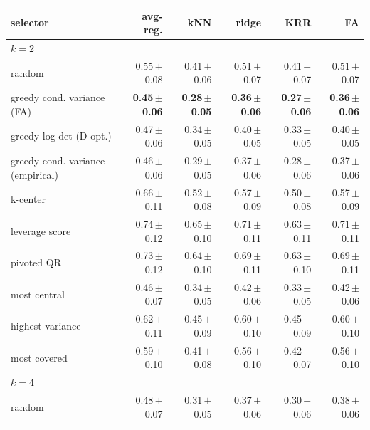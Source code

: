 \begin{tabular}{lrrrrr}
\toprule
selector & avg-reg. & kNN & ridge & KRR & FA \\
\midrule
\multicolumn{6}{l}{\emph{$k=2$}} \\
random & 0.55\,{\scriptsize$\pm$0.08} & 0.41\,{\scriptsize$\pm$0.06} & 0.51\,{\scriptsize$\pm$0.07} & 0.41\,{\scriptsize$\pm$0.07} & 0.51\,{\scriptsize$\pm$0.07} \\
greedy cond. variance (FA) & \textbf{0.45\,{\scriptsize$\pm$0.06}} & \textbf{0.28\,{\scriptsize$\pm$0.05}} & \textbf{0.36\,{\scriptsize$\pm$0.06}} & \textbf{0.27\,{\scriptsize$\pm$0.06}} & \textbf{0.36\,{\scriptsize$\pm$0.06}} \\
greedy log-det (D-opt.) & 0.47\,{\scriptsize$\pm$0.06} & 0.34\,{\scriptsize$\pm$0.05} & 0.40\,{\scriptsize$\pm$0.05} & 0.33\,{\scriptsize$\pm$0.05} & 0.40\,{\scriptsize$\pm$0.05} \\
greedy cond. variance (empirical) & 0.46\,{\scriptsize$\pm$0.06} & 0.29\,{\scriptsize$\pm$0.05} & 0.37\,{\scriptsize$\pm$0.06} & 0.28\,{\scriptsize$\pm$0.06} & 0.37\,{\scriptsize$\pm$0.06} \\
k-center & 0.66\,{\scriptsize$\pm$0.11} & 0.52\,{\scriptsize$\pm$0.08} & 0.57\,{\scriptsize$\pm$0.09} & 0.50\,{\scriptsize$\pm$0.08} & 0.57\,{\scriptsize$\pm$0.09} \\
leverage score & 0.74\,{\scriptsize$\pm$0.12} & 0.65\,{\scriptsize$\pm$0.10} & 0.71\,{\scriptsize$\pm$0.11} & 0.63\,{\scriptsize$\pm$0.11} & 0.71\,{\scriptsize$\pm$0.11} \\
pivoted QR & 0.73\,{\scriptsize$\pm$0.12} & 0.64\,{\scriptsize$\pm$0.10} & 0.69\,{\scriptsize$\pm$0.11} & 0.63\,{\scriptsize$\pm$0.10} & 0.69\,{\scriptsize$\pm$0.11} \\
most central & 0.46\,{\scriptsize$\pm$0.07} & 0.34\,{\scriptsize$\pm$0.05} & 0.42\,{\scriptsize$\pm$0.06} & 0.33\,{\scriptsize$\pm$0.05} & 0.42\,{\scriptsize$\pm$0.06} \\
highest variance & 0.62\,{\scriptsize$\pm$0.11} & 0.45\,{\scriptsize$\pm$0.09} & 0.60\,{\scriptsize$\pm$0.10} & 0.45\,{\scriptsize$\pm$0.09} & 0.60\,{\scriptsize$\pm$0.10} \\
most covered & 0.59\,{\scriptsize$\pm$0.10} & 0.41\,{\scriptsize$\pm$0.08} & 0.56\,{\scriptsize$\pm$0.10} & 0.42\,{\scriptsize$\pm$0.07} & 0.56\,{\scriptsize$\pm$0.10} \\
\multicolumn{6}{l}{\emph{$k=4$}} \\
random & 0.48\,{\scriptsize$\pm$0.07} & 0.31\,{\scriptsize$\pm$0.05} & 0.37\,{\scriptsize$\pm$0.06} & 0.30\,{\scriptsize$\pm$0.06} & 0.38\,{\scriptsize$\pm$0.06} \\

\end{tabular}
